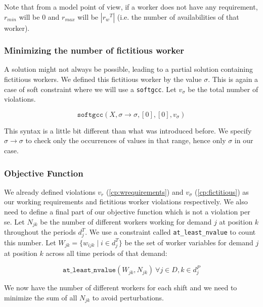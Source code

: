 \documentclass[../../thesis.tex]{subfiles}
\begin{document}
Note that from a model point of view, if a worker does not have any requirement, $r_{min}$ will be 0 and $r_{max}$ will be $|{r_w}^T| $ (i.e. the number of availabilities of that worker).

\subsubsection{Minimizing the number of fictitious worker}

A solution might not always be possible, leading to a partial solution containing fictitious workers.
We defined this fictitious worker by the value $\sigma$. This is again a case of soft constraint where 
we will use a \texttt{softgcc}. Let $v_{\sigma}$ be the total number of violations.


\begin{equation}
  \texttt{softgcc}(X, \sigma \rightarrow \sigma, [0], [0], v_{\sigma}) \label{cp:fictitious}
\end{equation}

This syntax is a little bit different than what was introduced before. We specify $\sigma \rightarrow \sigma$ to check only the occurrences of values 
in that range, hence only $\sigma$ in our case.


\subsubsection{Objective Function}

We already defined violations $v_r$ (\ref{cp:wrequirements}) and $v_{\sigma}$ (\ref{cp:fictitious}) as our working requirements and fictitious worker violations respectively.
We also need to define a final part of our objective function which is not a violation per se. Let $N_{jk}$ be the number 
of different workers working for demand $j$ at position $k$ throughout the periods $d_j^T$. We use a 
constraint called \texttt{at\_least\_nvalue} to count this number.
Let  $W_{jk} = \{ w_{ijk} \mid i \in d^T_j \}$ be the set of worker variables for demand $j$ at position $k$ across all time periods of that demand:

\begin{equation}
  \texttt{at\_least\_nvalue}(W_{jk}, N_{jk}) \ \forall j \in D, k \in d^P_j
\end{equation}

We now have the number of different workers for each shift and we need to minimize the sum of all $N_{jk}$ to avoid perturbations.
\end{document}
